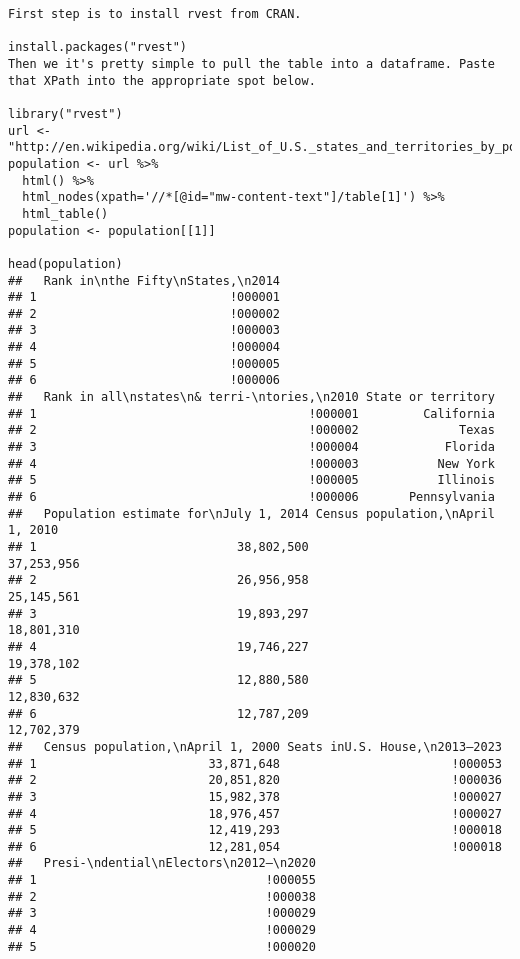 \begin{frame}
\begin{framed}
\begin{verbatim}
First step is to install rvest from CRAN.

install.packages("rvest")
Then we it's pretty simple to pull the table into a dataframe. Paste that XPath into the appropriate spot below.

library("rvest")
url <- "http://en.wikipedia.org/wiki/List_of_U.S._states_and_territories_by_population"
population <- url %>%
  html() %>%
  html_nodes(xpath='//*[@id="mw-content-text"]/table[1]') %>%
  html_table()
population <- population[[1]]

head(population)
##   Rank in\nthe Fifty\nStates,\n2014
## 1                           !000001
## 2                           !000002
## 3                           !000003
## 4                           !000004
## 5                           !000005
## 6                           !000006
##   Rank in all\nstates\n& terri-\ntories,\n2010 State or territory
## 1                                      !000001         California
## 2                                      !000002              Texas
## 3                                      !000004            Florida
## 4                                      !000003           New York
## 5                                      !000005           Illinois
## 6                                      !000006       Pennsylvania
##   Population estimate for\nJuly 1, 2014 Census population,\nApril 1, 2010
## 1                            38,802,500                        37,253,956
## 2                            26,956,958                        25,145,561
## 3                            19,893,297                        18,801,310
## 4                            19,746,227                        19,378,102
## 5                            12,880,580                        12,830,632
## 6                            12,787,209                        12,702,379
##   Census population,\nApril 1, 2000 Seats inU.S. House,\n2013–2023
## 1                        33,871,648                        !000053
## 2                        20,851,820                        !000036
## 3                        15,982,378                        !000027
## 4                        18,976,457                        !000027
## 5                        12,419,293                        !000018
## 6                        12,281,054                        !000018
##   Presi-\ndential\nElectors\n2012–\n2020
## 1                                !000055
## 2                                !000038
## 3                                !000029
## 4                                !000029
## 5                                !000020

\end{verbatim}
\end{framed}
\end{frame}
